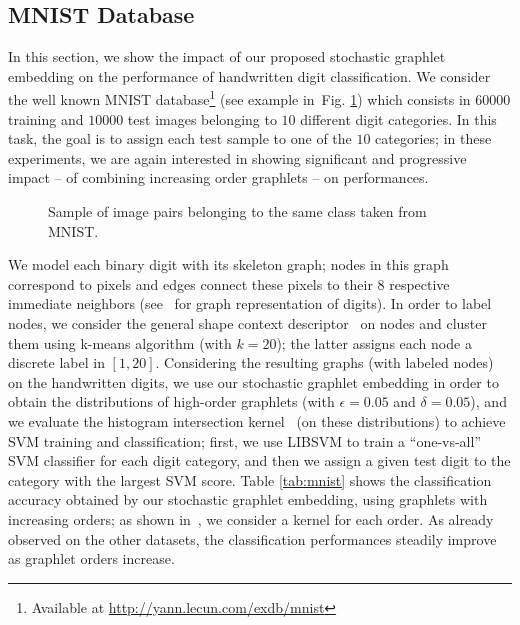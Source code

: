 \documentclass[journal]{IEEEtran}
\theoremstyle{definition}
\newcommand{\fig}[1]{Fig. \ref{#1}}
\newcommand{\tab}[1]{Table \ref{#1}}
\begin{document}
\subsection{MNIST Database}
In this section, we show the impact of our proposed stochastic graphlet embedding on the performance of handwritten digit classification. We consider the well known MNIST database\footnote{Available at \url{http://yann.lecun.com/exdb/mnist}} (see example in~\fig{fig:mnist}) which consists in $60000$ training and $10000$ test images belonging to $10$ different digit categories. In this task, the goal is to assign each test sample to one of the $10$ categories; in these experiments, we are again interested in showing significant and progressive impact -- of combining increasing order graphlets -- on performances. %
\begin{figure}[!htbp]
\centering
{}
\caption{Sample of image pairs belonging to the same class taken from MNIST.}
\label{fig:mnist}
\end{figure}
We model each binary digit with its skeleton graph; nodes in this graph correspond to pixels and edges connect these pixels to their 8 respective immediate neighbors (see~\cite{Dutta2018SGEsupp} for graph representation of digits). In order to label nodes, we consider the general shape context descriptor~\cite{Belongie2002} on nodes and cluster them using k-means algorithm (with $k=20$); the latter assigns each node a discrete label in $[1,20]$. Considering the resulting graphs (with labeled nodes) on the handwritten digits, we use our stochastic graphlet embedding in order to obtain the distributions of high-order graphlets (with $\epsilon=0.05$ and $\delta=0.05$), and we evaluate the histogram intersection {kernel~\cite{Barla2003}} (on these distributions) to achieve SVM training and classification; first, we use LIBSVM to train a ``one-vs-all'' SVM classifier for each digit category, and then we assign a given test digit to the category with the largest SVM score. \tab{tab:mnist} shows the classification accuracy obtained by our stochastic graphlet embedding, using graphlets with increasing orders; as shown in~\cite{Dutta2018SGEsupp}, we consider a kernel for each order. As already observed on the other datasets, the classification performances steadily improve as graphlet orders increase.
\end{document}
